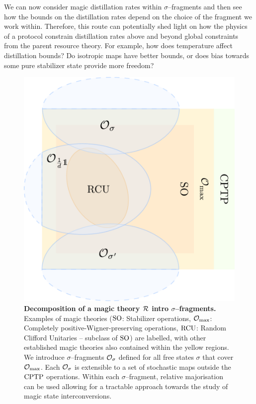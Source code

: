 \documentclass[pra,
aps,
twocolumn,
superscriptaddress,
groupedaddress,
nofootinbib,
reprint
]{revtex4-1}
\begin{document}
We can now consider magic distillation rates within $\sigma$--fragments and then see how the bounds on the distillation rates depend on the choice of the fragment we work within. Therefore, this route can potentially shed light on how the physics of a protocol constrain distillation rates above and beyond global constraints from the parent resource theory. For example, how does temperature affect distillation bounds? Do isotropic maps have better bounds, or does bias towards some pure stabilizer state provide more freedom?

\begin{figure}[t]
    \centering
        \includegraphics[scale=0.3
        ]{figs/operations.pdf}
    \caption{\textbf{Decomposition of a magic theory $\mathcal{R}$ intro $\sigma$--fragments.} 
	Examples of magic theories (${\rm{SO}}$: Stabilizer operations, $\mathcal{O}_{\rm{max}}$: Completely positive-Wigner-preserving operations, ${\rm{RCU}}$: Random Clifford Unitaries -- subclass of ${\rm{SO}}$) are labelled, with other established magic theories also contained within the yellow regions.
    We introduce $\sigma$--fragments $\mathcal{O}_\sigma$ defined for all free states $\sigma$ that cover $\mathcal{O}_{\rm{max}}$. 
    Each $\mathcal{O}_\sigma$ is extensible to a set of stochastic maps outside the ${\rm{CPTP}}$ operations.
    Within each $\sigma$--fragment, relative majorisation can be used allowing for a tractable approach towards the study of magic state interconversions.
    }
    \label{fig:zoo}
\end{figure}
\end{document}

